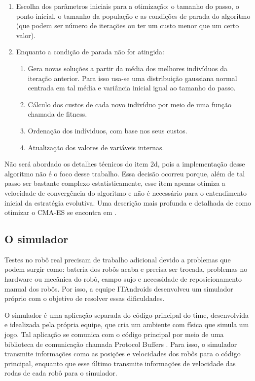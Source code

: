 \documentclass[a4paper,12pt]{article}
\begin{document}
\begin{enumerate}
\item Escolha dos parâmetros iniciais para a otimização: o tamanho do passo, o ponto inicial, o tamanho da população e as condições de parada do algoritmo (que podem ser número de iterações ou ter um custo menor que um certo valor).
\item Enquanto a condição de parada não for atingida:
\begin{enumerate}
\item Gera novas soluções a partir da média dos melhores indivíduos da iteração anterior. Para isso usa-se uma distribuição gaussiana normal centrada em tal média e variância inicial igual ao tamanho do passo.
\item Cálculo dos custos de cada novo indivíduo por meio de uma função chamada de fitness.
\item Ordenação dos indíviduos, com base nos seus custos.
\item Atualização dos valores de variáveis internas.
\end{enumerate}
\end{enumerate}

Não será abordado os detalhes técnicos do item 2d, pois a implementação desse algoritmo não é o foco desse trabalho. Essa decisão ocorreu porque, além de tal passo ser bastante complexo estatisticamente, esse item apenas otimiza a velocidade de convergência do algoritmo e não é necessário para o entendimento inicial da estratégia evolutiva. Uma descrição mais profunda e detalhada de como otimizar o CMA-ES se encontra em \cite{CMA-ES}.

\subsection{O simulador}

Testes no robô real precisam de trabalho adicional devido a problemas que podem surgir como: bateria dos robôs acaba e precisa ser trocada, problemas no hardware ou mecânica do robô, campo sujo e necessidade de reposicionamento manual dos robôs. Por isso, a equipe ITAndroids desenvolveu um simulador próprio com o objetivo de resolver essas dificuldades.

O simulador é uma aplicação separada do código principal do time, desenvolvida e idealizada pela própria equipe, que cria um ambiente com física que simula um jogo. Tal aplicação se comunica com o código principal por meio de uma biblioteca de comunicação chamada Protocol Buffers \cite{protobuf}. Para isso, o simulador transmite informações como as posições e velocidades dos robôs para o código principal, enquanto que esse último transmite informações de velocidade das rodas de cada robô para o simulador.
\end{document}
